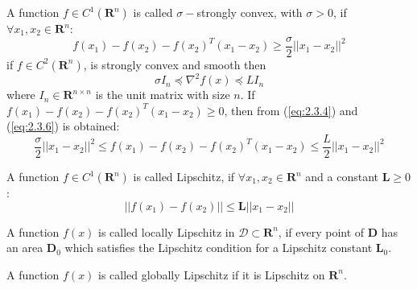     \begin{definition}\label{def:2.25}
        \cite{JBI1991} A function $f \in C^1({\mathbf{R}^n})$ is called $\sigma-$strongly convex, with $\sigma > 0$, if \hspace{1.0mm}$\forall x_1,x_2 \in \mathbf{R}^n$:
        \begin{equation}\label{eq:2.3.6}
            f(x_1) - f(x_2) - f(x_2)^T(x_1 - x_2) \geq \frac{\sigma}{2}||x_1 - x_2||^2
        \end{equation}
        if $f \in C^2({\mathbf{R}^n})$, is strongly convex and smooth then
        \begin{equation}\label{eq:2.3.7}
            \sigma I_n \preceq \nabla^2 f(x) \preceq LI_n
        \end{equation}
        where $I_n \in \mathbf{R}^{n \times n}$ is the unit matrix with size $n$. If $f(x_1) - f(x_2) - f(x_2)^T(x_1 - x_2) \geq 0$, then from (\ref{eq:2.3.4}) and (\ref{eq:2.3.6}) is obtained:
        \begin{equation}\label{eq:2.3.8}
            \frac{\sigma}{2}||x_1 - x_2||^2 \leq f(x_1) - f(x_2) - f(x_2)^T(x_1 - x_2) \leq \frac{L}{2}||x_1 - x_2||^2
        \end{equation}
    \end{definition}
    
    \begin{definition}\label{def:2.26}
        \cite{JBI1991} A function $f \in C^1({\mathbf{R}^n})$ is called Lipschitz, if  \hspace{1.0mm}$\forall x_1,x_2 \in \mathbf{R}^n$ and a constant $\mathbf{L} \geq 0$:
        \begin{equation}\label{eq:2.3.9}
            ||f(x_1) - f(x_2)|| \leq \mathbf{L} ||x_1 - x_2||
        \end{equation}
    \end{definition}
        
    \begin{definition}\label{def:2.27}
        \cite{JBI1991} A function $f(x)$ is called locally Lipschitz in $\mathcal{D} \subset \mathbf{R}^n$, if every point of $\mathbf{D}$ has an area $\mathbf{D}_0$ which satisfies the Lipschitz condition for a Lipschitz constant $\mathbf{L}_0$. 
    \end{definition}
    
    \begin{definition}\label{def:2.28} 
        \cite{JBI1991} A function $f(x)$ is called globally Lipschitz if it is Lipschitz on $\mathbf{R}^n$.
    \end{definition}
    
